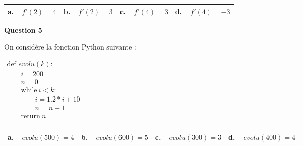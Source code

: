 \begin{center}
\begin{tabularx}{\linewidth}{|*{4}{X|}}\hline
\textbf{a.~~}$f'(2) = 4$& \textbf{b.~~}$f'(2) = 3$&\textbf{c.~~}$f'(4)=3$&\textbf{d.~~}$f'(4)= - 3$ \\ \hline
\end{tabularx}
\end{center}

\medskip

\textbf{Question 5}

\medskip

On considère la fonction Python suivante :

\begin{center}
$\begin{array}{l}
\text{def } evolu(k) :\\
\qquad  i = 200\\
\qquad n = 0\\
\qquad \text{while}\: i < k :\\
\qquad\qquad i= 1.2*i + 10\\
\qquad\qquad n = n+1\\
\qquad \text{return}\: n\\
\end{array}$
\end{center}

\begin{center}
\begin{tabularx}{\linewidth}{|*{4}{X|}}\hline
\textbf{a.~~}$evolu(500) = 4$& \textbf{b.~~}$evolu(600) = 5$&\textbf{c.~~}$evolu(300) = 3$&\textbf{d.~~}$evolu(400) = 4$\\ \hline
\end{tabularx}
\end{center}

\bigskip
